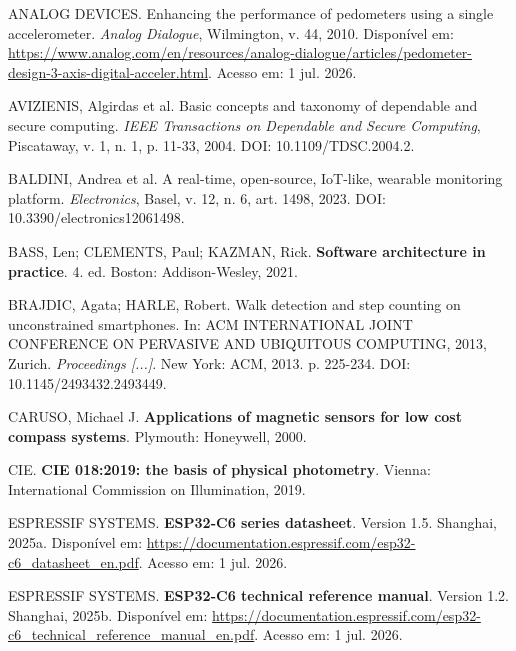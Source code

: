 \documentclass[a4paper,12pt]{article}
\begin{document}
\noindent ANALOG DEVICES. Enhancing the performance of pedometers using a single accelerometer. \emph{Analog Dialogue}, Wilmington, v. 44, 2010. Disponível em: \url{https://www.analog.com/en/resources/analog-dialogue/articles/pedometer-design-3-axis-digital-acceler.html}. Acesso em: 1 jul. 2026.\par\medskip

\noindent AVIZIENIS, Algirdas et al. Basic concepts and taxonomy of dependable and secure computing. \emph{IEEE Transactions on Dependable and Secure Computing}, Piscataway, v. 1, n. 1, p. 11-33, 2004. DOI: 10.1109/TDSC.2004.2.\par\medskip

\noindent BALDINI, Andrea et al. A real-time, open-source, IoT-like, wearable monitoring platform. \emph{Electronics}, Basel, v. 12, n. 6, art. 1498, 2023. DOI: 10.3390/electronics12061498.\par\medskip

\noindent BASS, Len; CLEMENTS, Paul; KAZMAN, Rick. \textbf{Software architecture in practice}. 4. ed. Boston: Addison-Wesley, 2021.\par\medskip

\noindent BRAJDIC, Agata; HARLE, Robert. Walk detection and step counting on unconstrained smartphones. In: ACM INTERNATIONAL JOINT CONFERENCE ON PERVASIVE AND UBIQUITOUS COMPUTING, 2013, Zurich. \emph{Proceedings [...]}. New York: ACM, 2013. p. 225-234. DOI: 10.1145/2493432.2493449.\par\medskip

\noindent CARUSO, Michael J. \textbf{Applications of magnetic sensors for low cost compass systems}. Plymouth: Honeywell, 2000.\par\medskip

\noindent CIE. \textbf{CIE 018:2019: the basis of physical photometry}. Vienna: International Commission on Illumination, 2019.\par\medskip

\noindent ESPRESSIF SYSTEMS. \textbf{ESP32-C6 series datasheet}. Version 1.5. Shanghai, 2025a. Disponível em: \url{https://documentation.espressif.com/esp32-c6_datasheet_en.pdf}. Acesso em: 1 jul. 2026.\par\medskip

\noindent ESPRESSIF SYSTEMS. \textbf{ESP32-C6 technical reference manual}. Version 1.2. Shanghai, 2025b. Disponível em: \url{https://documentation.espressif.com/esp32-c6_technical_reference_manual_en.pdf}. Acesso em: 1 jul. 2026.\par\medskip
\end{document}
